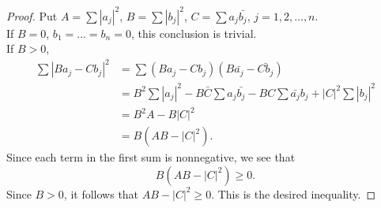 \begin{proof}
    Put $A = \sum |a_j|^2$, $B = \sum |b_j|^2$, $C = \sum a_j \bar{b_j}$, $j = 1,2,\dots,n$. \\    
    If $B = 0$, $b_1 = \dots = b_n = 0$, this conclusion is trivial.\\
    If $B > 0$, 
    \begin{align*}
        \sum \left|B a_j - C b_j\right|^2
        &= \sum (B a_j-C b_j)(B \bar{a_j} - \bar{C b_j})\\
        &= B^2\sum \left|a_j\right|^2 - B\bar{C}\sum a_j \bar{b_j} - BC \sum \bar{a_j} b_j + \left|C\right|^2\sum |b_j|^2\\
        &= B^2A-B|C|^2\\
        &= B(AB-|C|^2).
    \end{align*}
    Since each term in the first sum is nonnegative, we see that
    \begin{equation*}
        B(AB-|C|^2) \geq 0.
    \end{equation*}
    Since $B>0$, it follows that $AB-|C|^2 \geq 0$. This is the desired inequality.
\end{proof}

    
